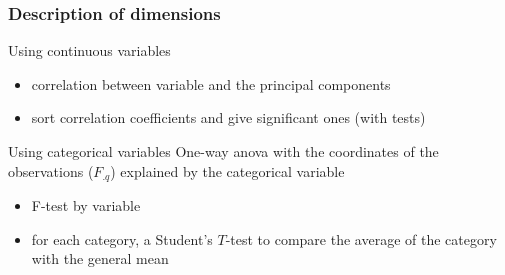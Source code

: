 \documentclass{beamer}\usepackage[]{graphicx}\usepackage[]{color}
\begin{document}


\begin{frame}[fragile]
\frametitle{Description of  dimensions}
  
  \begin{block}{Using continuous variables}
    \begin{itemize}
      \item correlation between variable and the principal components
      \item sort correlation coefficients and give significant ones (with tests)
    \end{itemize}
  \end{block}
  
  \begin{block}{Using categorical variables}
    One-way anova with the coordinates of the observations ($F_{.q}$) explained by the categorical variable
    \begin{itemize}
      \item F-test by variable
      \item for each category, a Student's $T$-test to compare the average of the category with the general mean
    \end{itemize}
  \end{block}

\end{frame}
\end{document}

